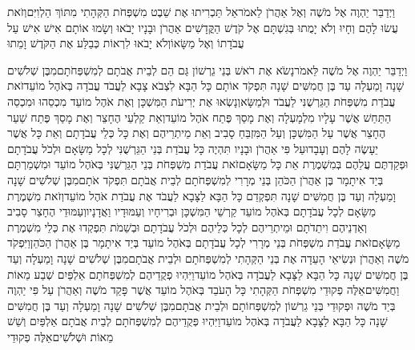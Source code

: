 \documentclass[../main/main.tex]{subfiles}
\begin{document}
\begin{multicols*}{\ncols}
וַיְדַבֵּר יַהְוֶה אֶל מֹשֶׁה וְאֶל אַהֲרֹן לֵאמֹר\PreVerseSpace{}אַל תַּכְרִיתוּ אֶת שֵׁבֶט מִשְׁפְּחֹת הַקְּהָתִי מִתּוֹךְ הַלְוִיִּם\PreVerseSpace{}וְזֹאת עֲשׂוּ לָהֶם וְחָיוּ וְלֹא יָמֻתוּ בְּגִשְׁתָּם אֶל\SubEnd{} קֹדֶשׁ הַקֳּדָשִׁים אַהֲרֹן וּבָנָיו יָבֹאוּ וְשָׂמוּ אוֹתָם אִישׁ אִישׁ עַל עֲבֹדָתוֹ וְאֶל מַשָּׂאוֹ\PreVerseSpace{}וְלֹא יָבֹאוּ לִרְאוֹת כְּבַלַּע אֶת הַקֹּדֶשׁ וָמֵתוּ\OpenSection{}\par
{}וַיְדַבֵּר יַהְוֶה אֶל מֹשֶׁה לֵּאמֹר\PreVerseSpace{}נָשֹׂא אֶת רֹאשׁ בְּנֵי גֵרְשׁוֹן גַּם הֵם לְבֵית אֲבֹתָם לְמִשְׁפְּחֹתָם\PreVerseSpace{}מִבֶּן שְׁלֹשִׁים שָׁנָה וָמַעְלָה עַד בֶּן חֲמִשִּׁים שָׁנָה תִּפְקֹד אוֹתָם כָּל הַבָּא לִצְבֹא צָבָא לַעֲבֹד עֲבֹדָה בְּאֹהֶל מוֹעֵד\PreVerseSpace{}זֹאת עֲבֹדַת מִשְׁפְּחֹת הַגֵּרְשֻׁנִּי לַעֲבֹד וּלְמַשָּׂא\PreVerseSpace{}וְנָשְׂאוּ אֶת יְרִיעֹת הַמִּשְׁכָּן וְאֶת אֹהֶל מוֹעֵד מִכְסֵהוּ וּמִכְסֵה הַתַּחַשׁ אֲשֶׁר עָלָיו מִלְמָעְלָה וְאֶת מָסַךְ פֶּתַח אֹהֶל מוֹעֵד\PreVerseSpace{}וְאֵת קַלְעֵי הֶחָצֵר וְאֶת מָסַךְ פֶּתַח שַׁעַר הֶחָצֵר אֲשֶׁר עַל הַמִּשְׁכָּן וְעַל הַמִּזְבֵּחַ סָבִיב וְאֵת מֵיתְרֵיהֶם וְאֶת כָּל כְּלֵי עֲבֹדָתָם וְאֵת כָּל אֲשֶׁר יֵעָשֶׂה לָהֶם וְעָבָדוּ\PreVerseSpace{}עַל פִּי אַהֲרֹן וּבָנָיו תִּהְיֶה כָּל עֲבֹדַת בְּנֵי הַגֵּרְשֻׁנִּי לְכָל מַשָּׂאָם וּלְכֹל עֲבֹדָתָם וּפְקַדְתֶּם עֲלֵהֶם בְּמִשְׁמֶרֶת אֵת כָּל מַשָּׂאָם\PreVerseSpace{}זֹאת עֲבֹדַת מִשְׁפְּחֹת בְּנֵי הַגֵּרְשֻׁנִּי בְּאֹהֶל מוֹעֵד וּמִשְׁמַרְתָּם בְּיַד אִיתָמָר בֶּן אַהֲרֹן הַכֹּהֵן \ClosedSection{}בְּנֵי מְרָרִי לְמִשְׁפְּחֹתָם לְבֵית אֲבֹתָם תִּפְקֹד אֹתָם\PreVerseSpace{}מִבֶּן שְׁלֹשִׁים שָׁנָה וָמַעְלָה וְעַד בֶּן חֲמִשִּׁים שָׁנָה תִּפְקְדֵם כָּל הַבָּא לַצָּבָא לַעֲבֹד אֶת עֲבֹדַת אֹהֶל מוֹעֵד\PreVerseSpace{}וְזֹאת מִשְׁמֶרֶת מַשָּׂאָם לְכָל עֲבֹדָתָם בְּאֹהֶל מוֹעֵד קַרְשֵׁי הַמִּשְׁכָּן וּבְרִיחָיו וְעַמּוּדָיו וַאֲדָנָיו\PreVerseSpace{}וְעַמּוּדֵי הֶחָצֵר סָבִיב וְאַדְנֵיהֶם וִיתֵדֹתָם וּמֵיתְרֵיהֶם לְכָל כְּלֵיהֶם וּלְכֹל עֲבֹדָתָם וּבְשֵׁמֹת תִּפְקְדוּ אֶת כְּלֵי מִשְׁמֶרֶת מַשָּׂאָם\PreVerseSpace{}זֹאת עֲבֹדַת מִשְׁפְּחֹת בְּנֵי מְרָרִי לְכָל עֲבֹדָתָם בְּאֹהֶל מוֹעֵד בְּיַד אִיתָמָר בֶּן אַהֲרֹן הַכֹּהֵן\PreVerseSpace{}וַיִּפְקֹד מֹשֶׁה וְאַהֲרֹן וּנְשִׂיאֵי הָעֵדָה אֶת בְּנֵי הַקְּהָתִי לְמִשְׁפְּחֹתָם וּלְבֵית אֲבֹתָם\PreVerseSpace{}מִבֶּן שְׁלֹשִׁים שָׁנָה וָמַעְלָה וְעַד בֶּן חֲמִשִּׁים שָׁנָה כָּל הַבָּא לַצָּבָא לַעֲבֹדָה בְּאֹהֶל מוֹעֵד\PreVerseSpace{}וַיִּהְיוּ פְקֻדֵיהֶם לְמִשְׁפְּחֹתָם אַלְפַּיִם שְׁבַע מֵאוֹת וַחֲמִשִּׁים\PreVerseSpace{}אֵלֶּה פְקוּדֵי מִשְׁפְּחֹת הַקְּהָתִי כָּל הָעֹבֵד בְּאֹהֶל מוֹעֵד אֲשֶׁר פָּקַד מֹשֶׁה וְאַהֲרֹן עַל פִּי יַהְוֶה בְּיַד מֹשֶׁה \ClosedSection{}וּפְקוּדֵי בְּנֵי גֵרְשׁוֹן לְמִשְׁפְּחוֹתָם וּלְבֵית אֲבֹתָם\PreVerseSpace{}מִבֶּן שְׁלֹשִׁים שָׁנָה וָמַעְלָה וְעַד בֶּן חֲמִשִּׁים שָׁנָה כָּל הַבָּא לַצָּבָא לַעֲבֹדָה בְּאֹהֶל מוֹעֵד\PreVerseSpace{}וַיִּהְיוּ פְּקֻדֵיהֶם לְמִשְׁפְּחֹתָם לְבֵית אֲבֹתָם אַלְפַּיִם וְשֵׁשׁ מֵאוֹת וּשְׁלֹשִׁים\PreVerseSpace{}אֵלֶּה פְקוּדֵי 
\end{multicols*}
\end{document}
